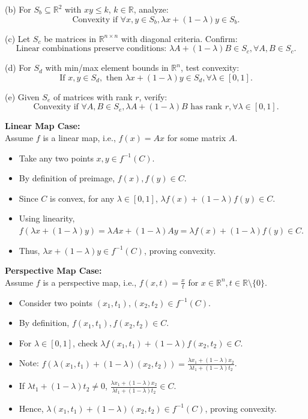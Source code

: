 \documentclass{exam}
\begin{document}
\begin{questions}
(b) For \( S_b \subseteq \mathbb{R}^2 \) with \( xy \leq k \), \( k \in \mathbb{R} \), analyze:
\[ \text{Convexity if } \forall x, y \in S_b, \lambda x + (1 - \lambda)y \in S_b. \]

(c) Let \( S_c \) be matrices in \( \mathbb{R}^{n \times n} \) with diagonal criteria. Confirm:
\[ \text{Linear combinations preserve conditions: } \lambda A + (1 - \lambda)B \in S_c, \forall A, B \in S_c. \]

(d) For \( S_d \) with min/max element bounds in \( \mathbb{R}^n \), test convexity:
\[ \text{If } x, y \in S_d, \text{ then } \lambda x + (1 - \lambda)y \in S_d, \forall \lambda \in [0,1]. \]

(e) Given \( S_e \) of matrices with rank \( r \), verify:
\[ \text{Convexity if } \forall A, B \in S_e, \lambda A + (1 - \lambda)B \text{ has rank } r, \forall \lambda \in [0,1]. \]




\textbf{Linear Map Case:} \\
Assume \( f \) is a linear map, i.e., \( f(x) = Ax \) for some matrix \( A \).
\begin{itemize}
    \item Take any two points \( x, y \in f^{-1}(C) \).
    \item By definition of preimage, \( f(x), f(y) \in C \).
    \item Since \( C \) is convex, for any \( \lambda \in [0,1] \), \( \lambda f(x) + (1-\lambda)f(y) \in C \).
    \item Using linearity, \( f(\lambda x + (1-\lambda)y) = \lambda Ax + (1-\lambda)Ay = \lambda f(x) + (1-\lambda)f(y) \in C \).
    \item Thus, \( \lambda x + (1-\lambda)y \in f^{-1}(C) \), proving convexity.
\end{itemize}

\textbf{Perspective Map Case:} \\
Assume \( f \) is a perspective map, i.e., \( f(x, t) = \frac{x}{t} \) for \( x \in \mathbb{R}^n, t \in \mathbb{R} \setminus \{0\} \).
\begin{itemize}
    \item Consider two points \( (x_1, t_1), (x_2, t_2) \in f^{-1}(C) \).
    \item By definition, \( f(x_1, t_1), f(x_2, t_2) \in C \).
    \item For \( \lambda \in [0,1] \), check \( \lambda f(x_1, t_1) + (1-\lambda)f(x_2, t_2) \in C \).
    \item Note: \( f(\lambda(x_1, t_1) + (1-\lambda)(x_2, t_2)) = \frac{\lambda x_1 + (1-\lambda)x_2}{\lambda t_1 + (1-\lambda)t_2} \).
    \item If \( \lambda t_1 + (1-\lambda)t_2 \neq 0 \), \( \frac{\lambda x_1 + (1-\lambda)x_2}{\lambda t_1 + (1-\lambda)t_2} \in C \).
    \item Hence, \( \lambda(x_1, t_1) + (1-\lambda)(x_2, t_2) \in f^{-1}(C) \), proving convexity.
\end{itemize}


\end{questions}
\end{document}
